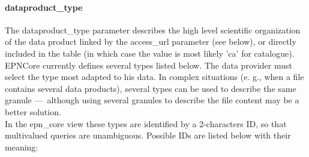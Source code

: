 \documentclass[11pt,a4paper]{ivoa}
\begin{document}
\paragraph{dataproduct\_type}

The dataproduct\_type parameter describes the high level scientific organization of the data product linked by the access\_url parameter (see below), or directly included in the table (in which case the value is most likely 'ca' for catalogue). EPNCore currently defines several types listed below. The data provider must select the type most adapted to his data. In complex situations (e. g., when a file contains several data products), several types can be used to describe the same granule — although using several granules to describe the file content may be a better solution. \\ In the epn\_core view these types are identified by a 2-characters ID, so that multivalued queries are unambiguous. Possible IDs are listed below with their meaning:
\end{document}
